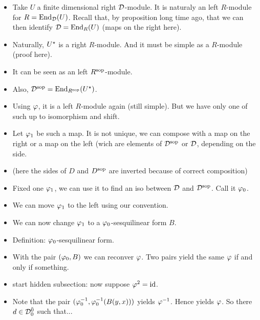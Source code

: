 \documentclass{amsbook}
\begin{document}
\begin{itemize}
        \item Take $U$ a finite dimensional right $\mathcal{D}$-module. It is naturaly an left $R$-module for $R = \operatorname{End}_{\mathcal{D}} (U)$. Recall that, by proposition long time ago, that we can then identify $\mathcal{D} = \operatorname{End}_R(U)$ (maps on the right here).
        
        \item Naturally, $U^\star$ is a right $R$-module. And it must be simple as a $R$-module (proof here).
        
        \item It can be seen as an left $R^{\mathrm{sop}}$-module.
        
        \item Also, $\mathcal{D}^{\mathrm{sop}} = \operatorname{End}_{R^{\mathrm{sop}}} (U^\star)$.
        
        \item Using $\varphi$, it is a left $R$-module again (still simple). But we have only one of such up to isomorphism and shift.
        
        \item Let $\varphi_1$ be such a map. It is not unique, we can compose with a map on the right or a map on the left (wich are elements of $\mathcal{D}^{\mathrm{sop}}$ or $\mathcal{D}$, depending on the side.
        
        \item (here the sides of $D$ and $D^{\mathrm{sop}}$ are inverted because of correct composition)
        
        \item Fixed one $\varphi_1$, we can use it to find an iso between $\mathcal{D}$ and $\mathcal{D}^{\mathrm{sop}}$. Call it $\varphi_0$.
        
        \item We can move $\varphi_1$ to the left using our convention.
        
        \item We can now change $\varphi_1$ to a $\varphi_0$-sesquilinear form $B$.
        
        \item Definition: $\varphi_0$-sesquilinear form.
        
        \item With the pair $(\varphi_0, B)$ we can reconver $\varphi$. Two pairs yield the same $\varphi$ if and only if something.
        
        \item start hidden subsection: now suppose $\varphi^2 = \operatorname{id}$.
        
        \item Note that the pair $(\varphi_0^{-1}, \varphi_0^{-1} (B (y,x)))$ yields $\varphi^{-1}$. Hence yields $\varphi$. So there $d\in \mathcal{D}^{\bar0}_0$ such that...
        

\end{itemize}
\end{document}
